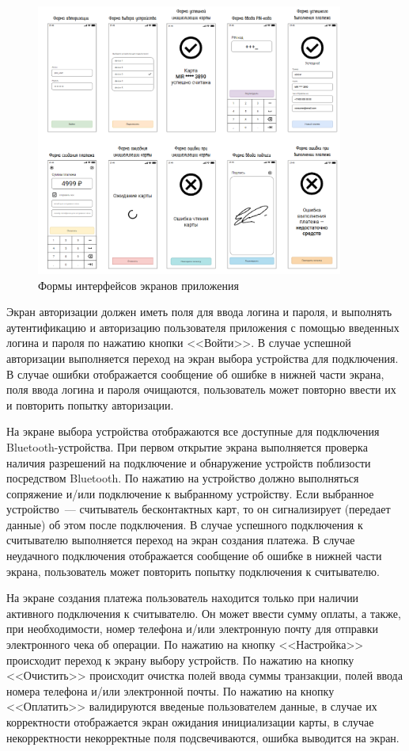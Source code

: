 \begin{figure}[h]
    \centering
    \includegraphics[width=0.9\textwidth]{images/design/screens}
    \caption{\centering Формы интерфейсов экранов приложения}
    \label{fig:screens}
\end{figure}

Экран авторизации должен иметь поля для ввода логина и пароля, и выполнять аутентификацию и авторизацию пользователя приложения с помощью введенных логина и пароля по нажатию кнопки <<Войти>>.
В случае успешной авторизации выполняется переход на экран выбора устройства для подключения.
В случае ошибки отображается сообщение об ошибке в нижней части экрана, поля ввода логина и пароля очищаются, пользователь может повторно ввести их и повторить попытку авторизации.

На экране выбора устройства отображаются все доступные для подключения Bluetooth-устройства.
При первом открытие экрана выполняется проверка наличия разрешений на подключение и обнаружение устройств поблизости посредством Bluetooth.
По нажатию на устройство должно выполняться сопряжение и/или подключение к выбранному устройству.
Если выбранное устройство~--- считыватель бесконтактных карт, то он сигнализирует (передает данные) об этом после подключения.
В случае успешного подключения к считывателю выполняется переход на экран создания платежа.
В случае неудачного подключения отображается сообщение об ошибке в нижней части экрана, пользователь может повторить попытку подключения к считывателю.

На экране создания платежа пользователь находится только при наличии активного подключения к считывателю.
Он может ввести сумму оплаты, а также, при необходимости, номер телефона и/или электронную почту для отправки электронного чека об операции.
По нажатию на кнопку <<Настройка>> происходит переход к экрану выбору устройств.
По нажатию на кнопку <<Очистить>> происходит очистка полей ввода суммы транзакции, полей ввода номера телефона и/или электронной почты.
По нажатию на кнопку <<Оплатить>> валидируются введеные пользователем данные, в случае их корректности отображается экран ожидания инициализации карты, в случае некорректности некорректные поля подсвечиваются, ошибка выводится на экран.

